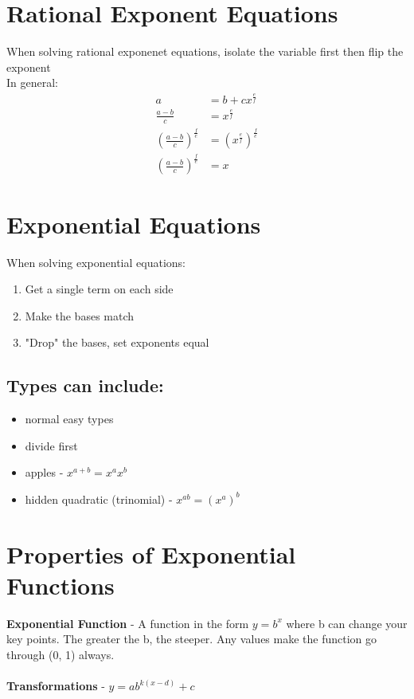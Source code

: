 \documentclass{article}
\begin{document}

\section{Rational Exponent Equations}
When solving rational exponenet equations, isolate the variable first then flip the exponent \\

In general:
\begin{align*}
    a &= b + cx^{\frac{e}{f}}\\
    \frac{a-b}{c} &= x^{\frac{e}{f}}\\
    \left(\frac{a-b}{c}\right)^{\frac{f}{e}} &= \left(x^{\frac{e}{f}}\right)^{\frac{f}{e}}\\
    \left(\frac{a-b}{c}\right)^{\frac{f}{e}} &= x
\end{align*}

\section{Exponential Equations}
When solving exponential equations:\\
\begin{enumerate}
    \item Get a single term on each side
    \item Make the bases match
    \item "Drop" the bases, set exponents equal
\end{enumerate}

\subsection*{Types can include:}
\begin{itemize}
    \item normal easy types
    \item divide first
    \item apples - $x^{a+b} = x^ax^b$
    \item hidden quadratic (trinomial) -  $x^{ab} = (x^a)^b$
\end{itemize}



\section{Properties of Exponential Functions}

\textbf{Exponential Function} - A function in the form $y=b^x$ where b can change your key points. The greater the b, the steeper. Any values make the function go through (0, 1) always. \\\\
\noindent
\textbf{Transformations} - $y = ab^{k(x-d)}+c$



\end{document}
